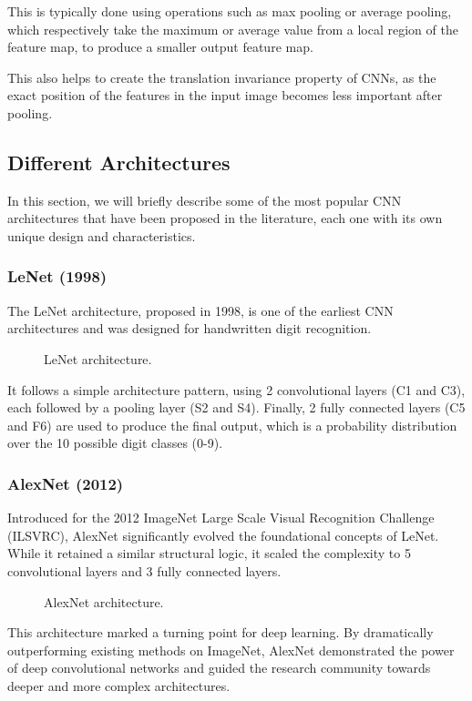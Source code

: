 This is typically done using operations such as max pooling or average pooling, which respectively take the maximum or average 
value from a local region of the feature map, to produce a smaller output feature map.

This also helps to create the translation invariance property of CNNs, as the exact position of the features in the input image becomes less important after pooling.

\subsection{Different Architectures}
In this section, we will briefly describe some of the most popular CNN architectures that have been proposed in the literature, each one with its own unique design and characteristics.

\subsubsection{LeNet (1998)}
The LeNet architecture, proposed in 1998, is one of the earliest CNN architectures and was designed for handwritten digit recognition.
\begin{figure}[H]
    \centering
    
    \caption{LeNet architecture.}
    \label{fig:LeNet}
\end{figure}
It follows a simple architecture pattern, using 2 convolutional layers (C1 and C3), each followed by a pooling layer (S2 and S4).
Finally, 2 fully connected layers (C5 and F6) are used to produce the final output, which is a probability distribution over the 10 possible digit classes (0-9).

\subsubsection{AlexNet (2012)}
Introduced for the 2012 ImageNet Large Scale Visual Recognition Challenge (ILSVRC), AlexNet significantly evolved the foundational 
concepts of LeNet. 
While it retained a similar structural logic, it scaled the complexity to 5 convolutional layers and 3 fully connected layers.
\begin{figure}[H]
    \centering
    
    \caption{AlexNet architecture.}
    \label{fig:AlexNet}
\end{figure}
This architecture marked a turning point for deep learning. 
By dramatically outperforming existing methods on ImageNet, AlexNet demonstrated the power of deep convolutional networks and
guided the research community towards deeper and more complex architectures.

